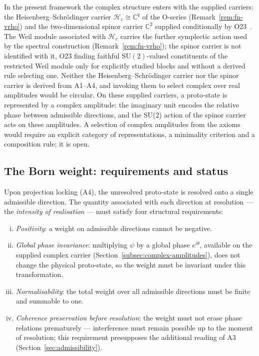 \documentclass[11pt,a4paper]{article}
\begin{document}
    In the present framework the complex structure enters with the supplied carriers: the
    Heisenberg--Schr\"odinger carrier $\mathcal{H}_c \cong \mathbb{C}^q$ of the O-series
    (Remark~\ref{rem:fn-vrho}) and the two-dimensional spinor carrier $\mathbb{C}^2$ supplied conditionally by
    O23~\cite{Beau2026a27}.
    The Weil module associated with $\mathcal{H}_c$ carries the further symplectic action used by the spectral
    construction (Remark~\ref{rem:fn-vrho}); the spinor carrier is not identified with it, O23 finding faithful
    $\mathrm{SU}(2)$-valued constituents of the restricted Weil module only for explicitly studied blocks and
    without a derived rule selecting one.
    Neither the Heisenberg--Schr\"odinger carrier nor the spinor carrier is derived from A1--A4, and invoking them
    to select complex over real amplitudes would be circular.
    On these supplied carriers, a proto-state is represented by a complex amplitude: the imaginary unit
    encodes the relative phase between admissible directions, and the SU(2) action of the spinor carrier
    acts on these amplitudes.
    A selection of complex amplitudes from the axioms would require an explicit category of
    representations, a minimality criterion and a composition rule; it is open.

  \subsection{The Born weight: requirements and status}
    \label{subsec:born-weight}

    Upon projection locking (A4), the unresolved proto-state is resolved onto
    a single admissible direction.
    The quantity associated with each direction at resolution — the
    \emph{intensity of realisation} — must satisfy four structural requirements:

    \begin{enumerate}[(i)]
\item \emph{Positivity}: a weight on admissible directions cannot be negative.
\item \emph{Global phase invariance}: multiplying $\psi$ by a global phase
$e^{i\theta}$, available on the supplied complex carrier (Section~\ref{subsec:complex-amplitudes}), does not
change the physical proto-state, so the weight must be invariant under this transformation.
\item \emph{Normalisability}: the total weight over all admissible directions
must be finite and summable to one.
\item \emph{Coherence preservation before resolution}: the weight must not
erase phase relations prematurely — interference must remain possible up to
the moment of resolution; this requirement presupposes the additional reading of A3
(Section~\ref{sec:admissibility}).
    \end{enumerate}
\end{document}
